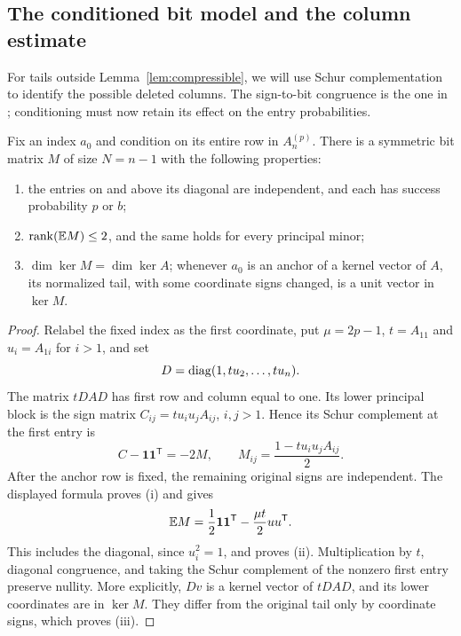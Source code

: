 \subsection{The conditioned bit model and the column estimate}

For tails outside Lemma~\ref{lem:compressible}, we will use
Schur complementation to identify the possible deleted columns.
The sign-to-bit congruence is the one in
\cite[Lemma~2.1]{SymmetricRate}; conditioning must now retain its
effect on the entry probabilities.

\begin{lemma}\label{lem:anchor-congruence}
Fix an index \(a_0\) and condition on its entire row in
\(A_n^{(p)}\). There is a symmetric bit matrix \(M\) of size
\(N=n-1\) with the following properties:
\begin{enumerate}[label=\textup{(\roman*)}]
\item the entries on and above its diagonal are independent,
and each has success probability \(p\) or \(b\);
\item \(\operatorname{rank}(\mathbb E M)\le2\), and the same holds for every
principal minor;
\item \(\dim\ker M=\dim\ker A\); whenever \(a_0\) is an anchor
of a kernel vector of \(A\), its normalized tail, with some
coordinate signs changed, is a unit vector in \(\ker M\).
\end{enumerate}
\end{lemma}

\begin{proof}
Relabel the fixed index as the first coordinate, put \(\mu=2p-1\),
\(t=A_{11}\)
and \(u_i=A_{1i}\) for \(i>1\), and set
\[
 D=\operatorname{diag}(1,tu_2,\ldots,tu_n).
\]
The matrix \(tDAD\) has first row and column equal to one.
Its lower principal block is the sign matrix
\(C_{ij}=tu_i u_j A_{ij}\), \(i,j>1\). Hence its Schur complement
at the first entry is
\[
 C-\mathbf1\mathbf1^{\mathsf T}=-2M,\qquad
 M_{ij}=\frac{1-tu_i u_j A_{ij}}2.
\]
After the anchor row is fixed, the remaining original signs are
independent. The displayed formula proves \textup{(i)} and gives
\[
 \mathbb E M=\frac12\mathbf1\mathbf1^{\mathsf T}
       -\frac{\mu t}{2}uu^{\mathsf T}.
\]
This includes the diagonal, since \(u_i^2=1\), and proves
\textup{(ii)}. Multiplication by \(t\), diagonal congruence,
and taking the Schur complement of the nonzero first entry
preserve nullity. More explicitly, \(Dv\) is a kernel vector
of \(tDAD\), and its lower coordinates are in \(\ker M\).
They differ from the original tail only by coordinate signs,
which proves \textup{(iii)}.
\end{proof}

